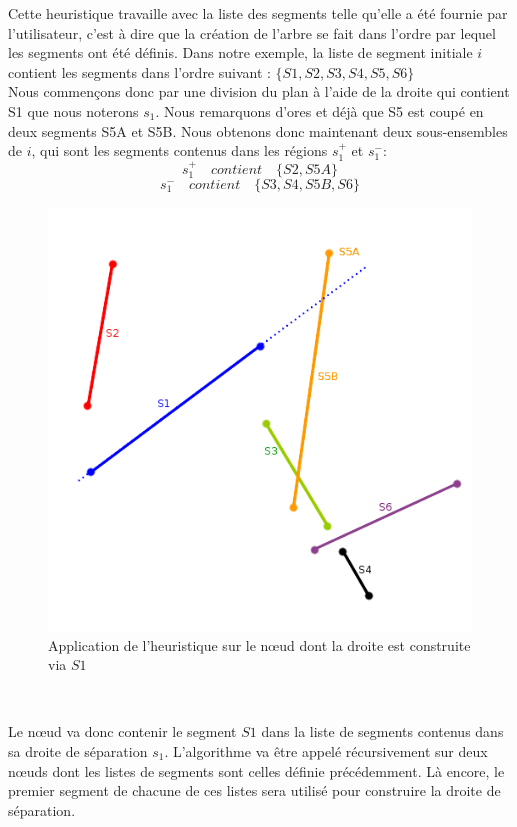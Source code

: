 \documentclass[11pt,a4paper]{article}
\theoremstyle{definition}
\theoremstyle{remark}
\begin{document}
Cette heuristique travaille avec la liste des segments telle qu'elle a été fournie par l'utilisateur, c'est à dire que la création de l'arbre se fait dans l'ordre par lequel les segments ont été définis. Dans notre exemple, la liste de segment initiale $i$ contient les segments dans l'ordre suivant : $\{S1,S2,S3,S4,S5,S6\}$ \\

Nous commençons donc par une division du plan à l'aide de la droite qui contient S1 que nous noterons $s_1$. Nous remarquons d'ores et déjà que S5 est coupé en deux segments S5A et S5B. Nous obtenons donc maintenant deux sous-ensembles de $i$, qui sont les segments contenus dans les régions $s_1^+$ et $s_1^-$: \\
$$s_1^+ \quad contient\quad \{S2, S5A\}$$
$$s_1^- \quad contient\quad \{S3,S4,S5B,S6\}$$

\begin{figure}[H]
\centering
\includegraphics[scale=0.6]{bsp_ex_2.png}
\caption{Application de l'heuristique sur le nœud dont la droite est construite via $S1$}
\label{bsp_inordre}
\end{figure}\\
\newpage

Le nœud va donc contenir le segment $S1$ dans la liste de segments contenus dans sa droite de séparation $s_1$. L'algorithme va être appelé récursivement sur deux nœuds dont les listes de segments sont celles définie précédemment. Là encore, le premier segment de chacune de ces listes sera utilisé pour construire la droite de séparation.\\
\end{document}
